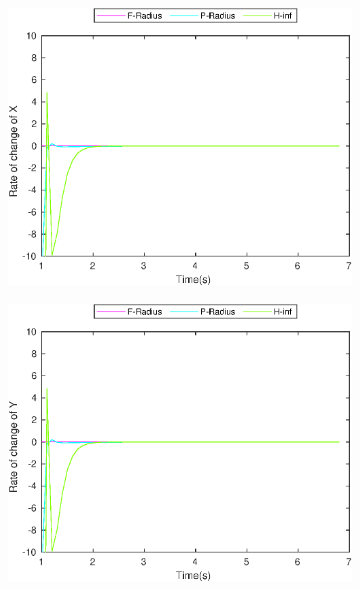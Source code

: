 \begin{figure}[h]
\begin{subfigure}{.5\linewidth}
\centering
\includegraphics[width=\linewidth]{figures/BoundChange/CV/cv_bound_changeX}
\end{subfigure}
\begin{subfigure}{.5\linewidth}
\centering
\includegraphics[width=\linewidth]{figures/BoundChange/CV/cv_bound_changeY}
\end{subfigure}
\begin{subfigure}{.5\linewidth}
\centering

\end{subfigure}
\end{figure}
